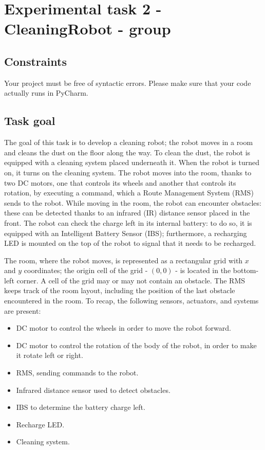 \chapter{Experimental task 2 - CleaningRobot - \notdd group}
\label{appendix:B_CleaningRobot}
\section{Constraints}
Your project must be free of syntactic errors. Please make sure that your code actually runs in PyCharm.


\section{Task goal}
The goal of this task is to develop a cleaning robot; the robot moves in a room and cleans the dust on the floor along the way. To clean the dust, the robot is equipped with a cleaning system placed underneath it. When the robot is turned on, it turns on the cleaning system.
The robot moves into the room, thanks to two DC motors, one that controls its wheels and another that controls its rotation, by executing a command, which a Route Management System (RMS) sends to the robot. While moving in the room, the robot can encounter obstacles: these can be detected thanks to an infrared (IR) distance sensor placed in the front.
The robot can check the charge left in its internal battery: to do so, it is equipped with an Intelligent Battery Sensor (IBS); furthermore, a recharging LED is mounted on the top of the robot to signal that it needs to be recharged.

The room, where the robot moves, is represented as a rectangular grid with $x$ and $y$ coordinates; the origin cell of the grid - \ie $(0,0)$ - is located in the bottom-left corner. A cell of the grid may or may not contain an obstacle. The RMS keeps track of the room layout, including the position of the last obstacle encountered in the room.
To recap, the following sensors, actuators, and systems are present:

\begin{itemize}
    \item DC motor to control the wheels in order to move the robot forward.
    \item DC motor to control the rotation of the body of the robot, in order to make it rotate left or right.
    \item RMS, sending commands to the robot.
    \item Infrared distance sensor used to detect obstacles.
    \item IBS to determine the battery charge left.
    \item Recharge LED.
    \item Cleaning system.
\end{itemize}

